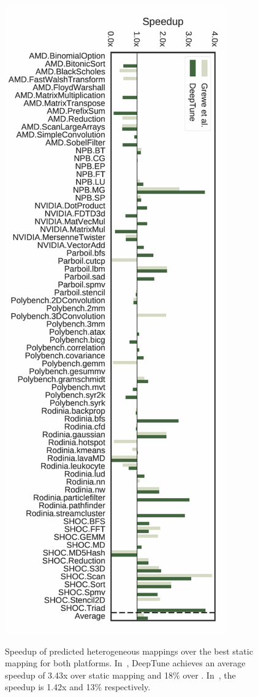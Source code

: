 \begin{figure}
{  	\includegraphics[width=.48\textwidth]{img/cgo-speedup-nvidia}%
  	\label{fig:cgo-speedup-nvidia}}%
  \caption[Speedup of predicted heterogeneous mappings]{%
    Speedup of predicted heterogeneous mappings over the best static mapping for both platforms. In~, DeepTune achieves an average speedup of 3.43x over static mapping and 18\% over \citeauthor{Grewe2013}. In~, the speedup is 1.42x and 13\% respectively.%
  }
  \label{fig:cgo-speedup}
\end{figure}
